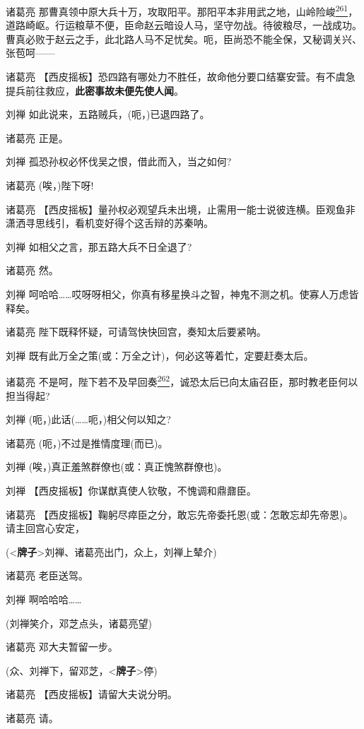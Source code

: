 诸葛亮
那曹真领中原大兵十万，攻取阳平。那阳平本非用武之地，山岭险峻\protect\hyperlink{fn261}{\textsuperscript{261}}，道路崎岖。行运粮草不便，臣命赵云暗设人马，坚守勿战。待彼粮尽，一战成功。曹真必败于赵云之手，此北路人马不足忧矣。呃，臣尚恐不能全保，又秘调关兴、张苞呵------

诸葛亮
【西皮摇板】恐四路有哪处力不胜任，故命他分要口结寨安营。有不虞急提兵前往救应，\textbf{此密事故未便先使人闻}。

刘禅 如此说来，五路贼兵，(呃，)已退四路了。

诸葛亮 正是。

刘禅 孤恐孙权必怀伐吴之恨，借此而入，当之如何?

诸葛亮 (唉，)陛下呀!

诸葛亮
【西皮摇板】量孙权必观望兵未出境，止需用一能士说彼连横。臣观鱼非潇洒寻思线引，看机变好得个这舌辩的苏秦呐。

刘禅 如相父之言，那五路大兵不日全退了?

诸葛亮 然。

刘禅
呵哈哈\ldots{}\ldots{}哎呀呀相父，你真有移星换斗之智，神鬼不测之机。使寡人万虑皆释矣。

诸葛亮 陛下既释怀疑，可请驾快快回宫，奏知太后要紧呐。

刘禅 既有此万全之策(或：万全之计)，何必这等着忙，定要赶奏太后。

诸葛亮
不是呵，陛下若不及早回奏\protect\hyperlink{fn262}{\textsuperscript{262}}，诚恐太后已向太庙召臣，那时教老臣何以担当得起?

刘禅 (呃，)此话(\ldots{}\ldots{}呃，)相父何以知之?

诸葛亮 (呃，)不过是推情度理(而已)。

刘禅 (唉，)真正羞煞群僚也(或：真正愧煞群僚也)。

刘禅 【西皮摇板】你谋猷真使人钦敬，不愧调和鼎鼐臣。

诸葛亮
【西皮摇板】鞠躬尽瘁臣之分，敢忘先帝委托恩(或：怎敢忘却先帝恩)。请主回宫心安定，

(\textless{}\textbf{牌子}\textgreater{}刘禅、诸葛亮出门，众上，刘禅上辇介)

诸葛亮 老臣送驾。

刘禅 啊哈哈哈\ldots{}\ldots{}

(刘禅笑介，邓芝点头，诸葛亮望)

诸葛亮 邓大夫暂留一步。

(众、刘禅下，留邓芝，\textless{}\textbf{牌子}\textgreater{}停)

诸葛亮 【西皮摇板】请留大夫说分明。

诸葛亮 请。

